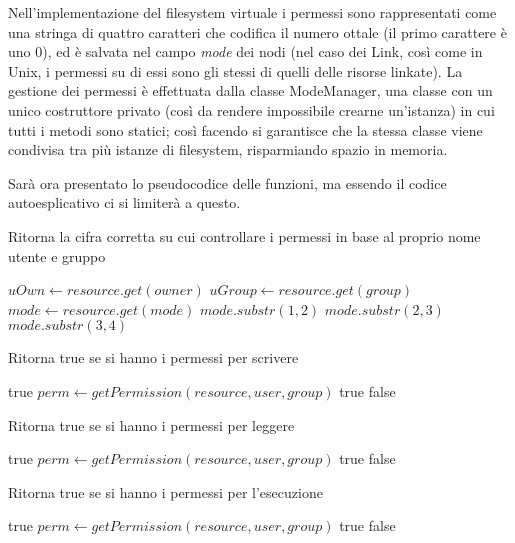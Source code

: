  Nell'implementazione del filesystem virtuale i permessi sono rappresentati come una stringa di quattro caratteri che codifica il numero ottale (il primo carattere è uno 0), ed è salvata nel campo \emph{mode} dei nodi (nel caso dei Link, così come in Unix, i permessi su di essi sono gli stessi di quelli delle risorse linkate). La gestione dei permessi è effettuata dalla classe ModeManager, una classe con un unico costruttore privato (così da rendere impossibile crearne un'istanza) in cui tutti i metodi sono statici; così facendo si garantisce che la stessa classe viene condivisa tra più istanze di filesystem, risparmiando spazio in memoria.
 
 Sarà ora presentato lo pseudocodice delle funzioni, ma essendo il codice autoesplicativo ci si limiterà a questo.   
\begin{algorithm}
\caption{Ritorna la cifra corretta su cui controllare i permessi in base al proprio nome utente e gruppo}
\begin{algorithmic}
\State $uOwn\gets resource.get(owner)$
\State $uGroup\gets resource.get(group)$
\State $mode\gets resource.get(mode)$
	\State \Return $mode.substr(1,2)$
	\State \Return $mode.substr(2,3)$
\Else
	\State \Return $mode.substr(3,4)$
\EndIf
\EndFunction
\end{algorithmic}
\end{algorithm}
\begin{algorithm}
\caption{Ritorna true se si hanno i permessi per scrivere}
\begin{algorithmic}
	\State \Return true
\EndIf
\State $perm \gets getPermission(resource, user, group)$
	\State \Return true
\EndIf
\State \Return false
\EndFunction
\end{algorithmic}
\end{algorithm}
\begin{algorithm}
\caption{Ritorna true se si hanno i permessi per leggere}
\begin{algorithmic}
	\State \Return true
\EndIf
\State $perm \gets getPermission(resource, user, group)$
	\State \Return true
\EndIf
\State \Return false
\EndFunction
\end{algorithmic}
\end{algorithm}
   \begin{algorithm}
\caption{Ritorna true se si hanno i permessi per l'esecuzione}
\begin{algorithmic}
	\State \Return true
\EndIf
\State $perm \gets getPermission(resource, user, group)$
	\State \Return true
\EndIf
\State \Return false
\EndFunction
\end{algorithmic}
\end{algorithm}
